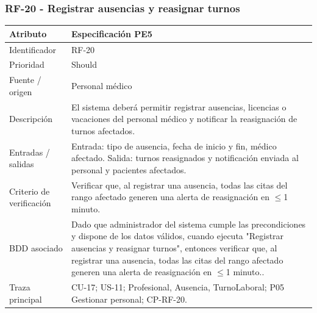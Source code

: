 \documentclass[11pt,a4paper]{article}
\begin{document}
\subsubsection{RF-20 - Registrar ausencias y reasignar turnos}
	\begin{tabularx}{\textwidth}{p{3.2cm}Y}
		\toprule
		\textbf{Atributo} & \textbf{Especificación PE5}\\\midrule
		Identificador & RF-20\\
		Prioridad & Should\\
		Fuente / origen & Personal médico\\
		Descripción & El sistema deberá permitir registrar ausencias, licencias o vacaciones del personal médico y notificar la reasignación de turnos afectados.\\
		Entradas / salidas & Entrada: tipo de ausencia, fecha de inicio y fin, médico afectado. Salida: turnos reasignados y notificación enviada al personal y pacientes afectados.\\
		Criterio de verificación & Verificar que, al registrar una ausencia, todas las citas del rango afectado generen una alerta de reasignación en $\leq$1 minuto.\\
		BDD asociado & Dado que administrador del sistema cumple las precondiciones y dispone de los datos válidos, cuando ejecuta "Registrar ausencias y reasignar turnos", entonces verificar que, al registrar una ausencia, todas las citas del rango afectado generen una alerta de reasignación en $\leq$1 minuto..\\
		Traza principal & CU-17; US-11; Profesional, Ausencia, TurnoLaboral; P05 Gestionar personal; CP-RF-20.\\
		\bottomrule
	\end{tabularx}
	\clearpage
\end{document}
